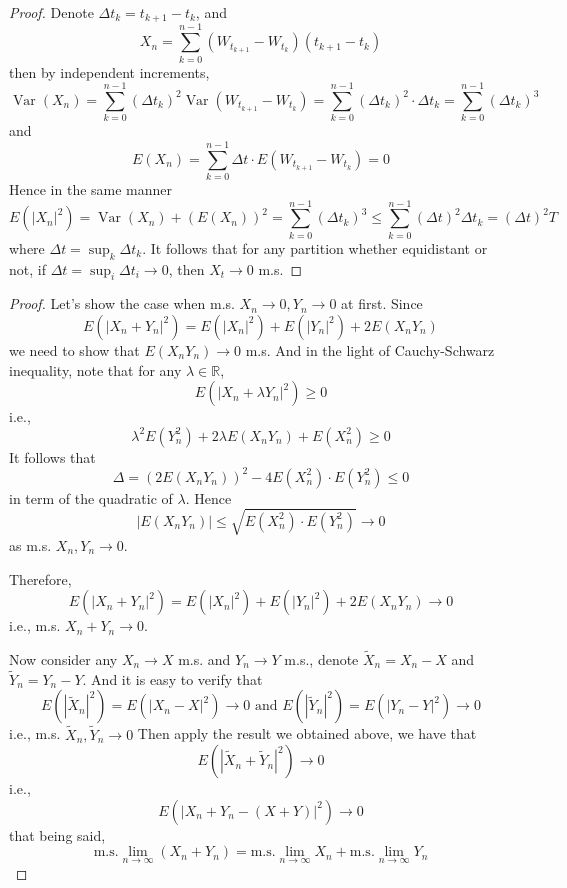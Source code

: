 \documentclass{homework}
\DeclareMathOperator{\var}{Var}
\begin{document}
    \problem
    \begin{proof}
        Denote $\Delta t_k=t_{k+1}-t_k$, and
        \[X_n=\sum_{k=0}^{n-1}(W_{t_{k+1}}-W_{t_k})(t_{k+1}-t_k)\]
        then by independent increments,
        \[\var(X_n)
        =\sum_{k=0}^{n-1}(\Delta t_k)^2\var(W_{t_{k+1}}-W_{t_k})
        =\sum_{k=0}^{n-1}(\Delta t_k)^2\cdot\Delta t_k
        =\sum_{k=0}^{n-1}(\Delta t_k)^3\]
        and 
        \[E(X_n)=\sum_{k=0}^{n-1}\Delta t\cdot E(W_{t_{k+1}}-W_{t_k})
        =0\]
        Hence in the same manner
        \[E(|X_n|^2)=\var(X_n)+(E(X_n))^2=\sum_{k=0}^{n-1}(\Delta t_k)^3
        \leq\sum_{k=0}^{n-1}(\Delta t)^2\Delta t_k
        =(\Delta t)^2 T\]
        where $\Delta t=\sup_{k}\Delta t_k$.
        It follows that
        for any partition whether equidistant or not,
        if $\Delta t=\sup_i\Delta t_i\to 0$,
        then $X_t\to 0$ m.s.
    \end{proof}

    \problem

    \problem
    \begin{proof}
        Let's show the case when m.s. $X_n\to 0,Y_n\to 0$ at first.
        Since
        \[E(|X_n+Y_n|^2)=E(|X_n|^2)+E(|Y_n|^2)+2E(X_nY_n)\]
        we need to show that $E(X_nY_n)\to 0$ m.s.
        And in the light of Cauchy-Schwarz inequality, note that
        for any $\lambda\in\mathbb R$,
        \[E(|X_n+\lambda Y_n|^2)\geq 0\]
        i.e.,
        \[\lambda^2E(Y_n^2)+2\lambda E(X_nY_n)+E(X_n^2)\geq 0\]
        It follows that
        \[\Delta=(2E(X_nY_n))^2-4E(X_n^2)\cdot E(Y_n^2)\leq 0\]
        in term of the quadratic of $\lambda$. Hence
        \[|E(X_nY_n)|\leq\sqrt{E(X_n^2)\cdot E(Y_n^2)}\to 0\]
        as m.s. $X_n,Y_n\to 0$.

        Therefore,
        \[E(|X_n+Y_n|^2)=E(|X_n|^2)+E(|Y_n|^2)+2E(X_nY_n)\to 0\]
        i.e., m.s. $X_n+Y_n\to 0$.

        Now consider any $X_n\to X$ m.s. and $Y_n\to Y$ m.s.,
        denote $\tilde X_n=X_n-X$ and $\tilde Y_n=Y_n-Y$.
        And it is easy to verify that
        \[E(|\tilde X_n|^2)=E(|X_n-X|^2)\to 0
        \text{ and }
        E(|\tilde Y_n|^2)=E(|Y_n-Y|^2)\to 0 \]
        i.e., m.s. $\tilde X_n,\tilde Y_n\to 0$
        Then apply the result we obtained above, we have that
        \[E(|\tilde X_n+\tilde Y_n|^2)\to 0\]
        i.e.,
        \[E(|X_n+Y_n-(X+Y)|^2)\to 0\]
        that being said,
        \[\text{m.s.}\lim_{n\to\infty}(X_n+Y_n)
        =\text{m.s.}\lim_{n\to\infty}X_n
        +\text{m.s.}\lim_{n\to\infty}Y_n\]
    \end{proof}
\end{document}
